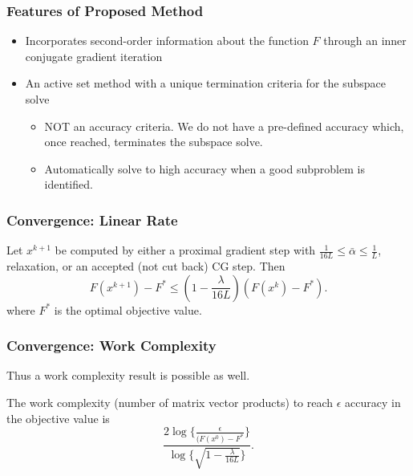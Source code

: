 \documentclass{beamer}
\begin{document}
	\begin{frame}
		\frametitle{Features of Proposed Method}
		\begin{itemize}
		\item Incorporates second-order information about the function $F$ through an inner conjugate gradient iteration \\
		\pause \item An active set method with a unique termination criteria for the subspace solve \\
		\begin{itemize}
		\item NOT an accuracy criteria. We do not have a pre-defined accuracy which, once reached, terminates the subspace solve.
		\item Automatically solve to high accuracy when a good subproblem is identified. 
		\end{itemize}
		\end{itemize}
	\end{frame}
	

	\begin{frame}
	                                            \frametitle{Convergence: Linear Rate}
	\begin{theorem}
	\label{thm:qlinear} 
	Let $x^{k+1}$ be computed by either a proximal gradient step with $\frac{1}{16L} \leq \bar{\alpha} \leq \frac{1}{L}$, relaxation, or an accepted (not cut back) CG step. Then 
	\begin{equation*}
	F(x^{k+1}) - F^* \leq (1-\frac{\lambda}{16 L}) (F(x^k) - F^*).
	  \end{equation*}
	where $F^*$ is the optimal objective value. 
	\end{theorem}
	                                 \end{frame} 
        
	        \begin{frame}
	                                                    \frametitle{Convergence: Work Complexity}
	      Thus a work complexity result is possible as well. 
	    \begin{corollary}
	    The work complexity (number of matrix vector products) to reach $\epsilon$ accuracy in the objective value is 
	 \begin{equation*}
	  \frac{ 2 \log \{\frac{\epsilon}{(F(x^0) - F^*} \}}{\log\{ \sqrt{1-\frac{\lambda}{16 L}}\} }. 
	   \end{equation*}
	\end{corollary}
	                         \end{frame}
							 
\end{document}
